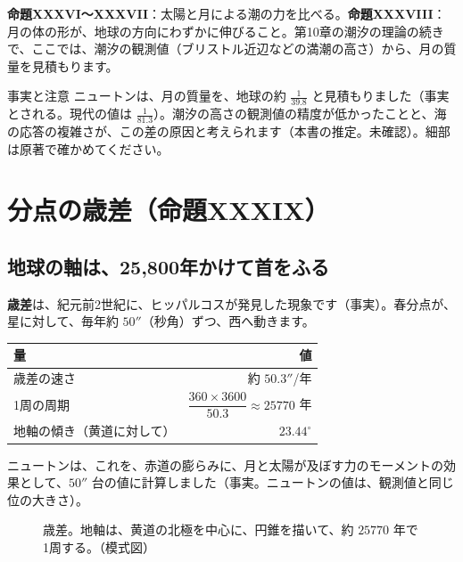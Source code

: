 \documentclass[a4paper,11pt,openany]{ltjsbook}
\begin{document}
\textbf{命題XXXVI〜XXXVII}：太陽と月による潮の力を比べる。\textbf{命題XXXVIII}：月の体の形が、地球の方向にわずかに伸びること。第10章の潮汐の理論の続きで、ここでは、潮汐の観測値（ブリストル近辺などの満潮の高さ）から、月の質量を見積もります。

\begin{notebox}{事実と注意}
ニュートンは、月の質量を、地球の約 $\frac1{39.8}$ と見積もりました（事実とされる。現代の値は $\frac1{81.3}$）。潮汐の高さの観測値の精度が低かったことと、海の応答の複雑さが、この差の原因と考えられます（本書の推定。未確認）。細部は原著で確かめてください。
\end{notebox}

\section{分点の歳差（命題XXXIX）}

\subsection{地球の軸は、25,800年かけて首をふる}

\textbf{歳差}は、紀元前2世紀に、ヒッパルコスが発見した現象です（事実）。春分点が、星に対して、毎年約 $50''$（秒角）ずつ、西へ動きます。

\begin{center}
\begin{tabular}{lr}
\toprule
量 & 値\\
\midrule
歳差の速さ & 約 $50.3''$/年\\
1周の周期 & $\dfrac{360\times3600}{50.3}\approx25770$ 年\\
地軸の傾き（黄道に対して） & $23.44^\circ$\\
\bottomrule
\end{tabular}
\end{center}

ニュートンは、これを、赤道の膨らみに、月と太陽が及ぼす力のモーメントの効果として、$50''$ 台の値に計算しました（事実。ニュートンの値は、観測値と同じ位の大きさ）。

\begin{figure}[htbp]
\centering
{}
\caption{歳差。地軸は、黄道の北極を中心に、円錐を描いて、約 $25770$ 年で1周する。（模式図）}
\end{figure}
\end{document}
